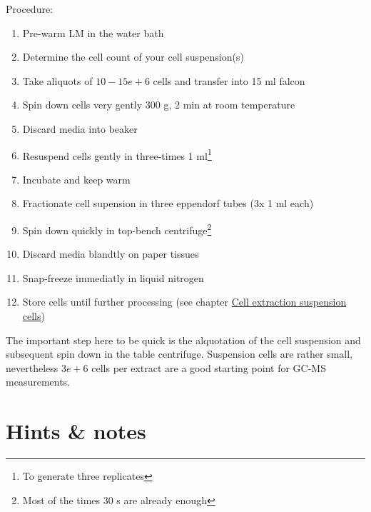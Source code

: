 \documentclass[]{book}
\providecommand{\tightlist}{%
  \setlength{\itemsep}{0pt}\setlength{\parskip}{0pt}}
\let\rmarkdownfootnote\footnote%
\def\footnote{\protect\rmarkdownfootnote}
\theoremstyle{definition}
\theoremstyle{definition}
\theoremstyle{definition}
\theoremstyle{remark}
\begin{document}
Procedure:

\begin{enumerate}
\def\labelenumi{\arabic{enumi}.}
\tightlist
\item
  Pre-warm LM in the water bath
\item
  Determine the cell count of your cell suspension(s)
\item
  Take aliquots of \(10-15e+6\) cells and transfer into 15 ml falcon
\item
  Spin down cells very gently 300 g, 2 min at room temperature
\item
  Discard media into beaker
\item
  Resuspend cells gently in three-times 1 ml\footnote{To generate three
    replicates}
\item
  Incubate and keep warm
\item
  Fractionate cell supension in three eppendorf tubes (3x 1 ml each)
\item
  Spin down quickly in top-bench centrifuge\footnote{Most of the times
    30 s are already enough}
\item
  Discard media blandtly on paper tissues
\item
  Snap-freeze immediatly in liquid nitrogen
\item
  Store cells until further processing (see chapter
  \protect\hyperlink{ccextraction_susp}{Cell extraction suspension
  cells})
\end{enumerate}

The important step here to be quick is the alquotation of the cell
suspension and subsequent spin down in the table centrifuge. Suspension
cells are rather small, nevertheless \(3e+6\) cells per extract are a
good starting point for GC-MS measurements.

\section{Hints \& notes}\label{hints-notes}
\end{document}
